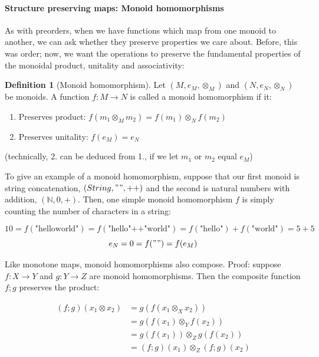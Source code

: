 \documentclass[
  openany]{book}
\providecommand{\tightlist}{%
  \setlength{\itemsep}{0pt}\setlength{\parskip}{0pt}}
\theoremstyle{definition}
\newtheorem{definition}{Definition}[chapter]
\theoremstyle{definition}
\theoremstyle{definition}
\theoremstyle{definition}
\theoremstyle{remark}
\begin{document}
\paragraph{Structure preserving maps: Monoid homomorphisms}\label{monoid-homomorphism}

As with preorders, when we have functions which map from one monoid to another, we can ask whether they preserve properties we care about. Before, this was order; now, we want the operations to preserve the fundamental properties of the monoidal product, unitality and associativity:

\begin{definition}[Monoid homomorphism]

Let \((M, e_M, \otimes_M)\) and \((N, e_N, \otimes_N)\) be monoids. A function \(f: M \to N\) is called a monoid homomorphism if it:

\begin{enumerate}
\def\labelenumi{\arabic{enumi}.}
\tightlist
\item
  Preserves product: \(f(m_1 \otimes_M m_2) = f(m_1) \otimes_N f(m_2)\)
\item
  Preserves unitality: \(f(e_M) = e_N\)
\end{enumerate}

\end{definition}

(technically, 2. can be deduced from 1., if we let \(m_1\) or \(m_2\) equal \(e_M\))

To give an example of a monoid homomorphism, suppose that our first monoid is string concatenation, \((String, "", ++)\) and the second is natural numbers with addition, \((\mathbb{N}, 0, +)\). Then, one simple monoid homomorphism \(f\) is simply counting the number of characters in a string:

\[10 = f(\text{"helloworld"}) = f(\text{"hello"} \text{++} \text{"world"}) = f(\text{"hello"}) + f(\text{"world"}) = 5 + 5\]
\[e_N = 0 = f("") = f(e_M)\]

Like monotone maps, monoid homomorphisms also compose. Proof: suppose \(f: X \to Y\) and \(g: Y \to Z\) are monoid homomorphisms. Then the composite function \(f ;g\) preserves the product:

\begin{align}
(f ;g)(x_1 \otimes x_2) & = g(f(x_1 \otimes_X x_2)) \\
& = g(f(x_1) \otimes_Y f(x_2)) \\
& = g(f(x_1)) \otimes_Z g(f(x_2)) \\
& = (f ;g)(x_1) \otimes_Z (f ;g)(x_2)
\end{align}
\end{document}
